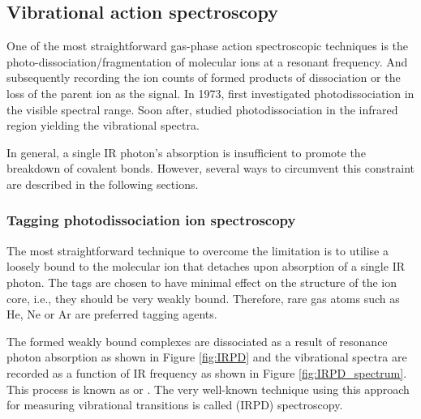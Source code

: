 \subsection{Vibrational action spectroscopy}
\label{subsec:action:methods:vibrational}

One of the most straightforward gas-phase action spectroscopic techniques is the photo-dissociation/fragmentation of molecular ions at a resonant frequency. And subsequently recording the ion counts of formed products of dissociation or the loss of the parent ion as the signal.
In 1973, \citet{dunbar_photodissociation_1973} first investigated photodissociation in the visible spectral range. Soon after, \citet{okumura_vibrational_1985} studied photodissociation in the infrared region yielding the vibrational spectra.

In general, a single IR photon's absorption is insufficient to promote the breakdown of covalent bonds. However, several ways to circumvent this constraint are described in the following sections.

\subsubsection{Tagging photodissociation ion spectroscopy}
\label{subsec:action:methods:vibrational:IRPD}
The most straightforward technique to overcome the limitation is to utilise a loosely bound  to the molecular ion that detaches upon absorption of a single IR photon. The tags are chosen to have minimal effect on the structure of the ion core, i.e., they should be very weakly bound. Therefore, rare gas atoms such as He, Ne or Ar are preferred tagging agents.

The formed weakly bound complexes are dissociated as a result of resonance photon absorption as shown in Figure \ref{fig:IRPD} and the vibrational spectra are recorded as a function of IR frequency as shown in Figure \ref{fig:IRPD_spectrum}. This process is known as  or . The very well-known technique using this approach for measuring vibrational transitions is called  (IRPD) spectroscopy.

